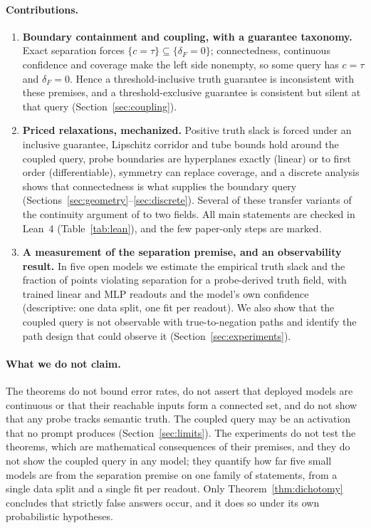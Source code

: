 \documentclass[10pt]{article}
\theoremstyle{definition}
\theoremstyle{remark}
\newcommand{\conf}{c}
\newcommand{\dF}{\delta_{\!F}}
\begin{document}
\paragraph{Contributions.}
\begin{enumerate}[leftmargin=*,itemsep=1pt,topsep=2pt]
\item \textbf{Boundary containment and coupling, with a guarantee
taxonomy.} Exact separation forces $\{\conf=\tau\}\subseteq\{\dF=0\}$;
connectedness, continuous confidence and coverage make the left side
nonempty, so some query has $\conf=\tau$ and $\dF=0$. Hence a threshold-inclusive
truth guarantee is inconsistent with these premises, and a
threshold-exclusive guarantee is consistent but silent at that query
(Section~\ref{sec:coupling}).
\item \textbf{Priced relaxations, mechanized.} Positive truth slack is
forced under an inclusive guarantee, Lipschitz corridor and tube bounds
hold around the coupled query, probe boundaries are hyperplanes exactly
(linear) or to first order (differentiable), symmetry can replace
coverage, and a discrete analysis shows that connectedness is what
supplies the boundary query (Sections~\ref{sec:geometry}--\ref{sec:discrete}).
Several of these transfer variants of the continuity argument of
\citet{bhatt2026defense} to two fields. All main statements are checked in Lean~4 (Table~\ref{tab:lean}), and
the few paper-only steps are marked.
\item \textbf{A measurement of the separation premise, and an
observability result.} In five open models we estimate the empirical truth
slack and the fraction of points violating separation for a probe-derived
truth field, with trained linear and MLP readouts and the model's own
confidence (descriptive: one data split, one fit per readout). We also
show that the coupled query is not observable with true-to-negation paths
and identify the path design that could observe it
(Section~\ref{sec:experiments}).
\end{enumerate}

\paragraph{What we do not claim.}
The theorems do not bound error rates, do not assert that deployed
models are continuous or that their reachable inputs form a connected
set, and do not show that any probe tracks semantic truth. The coupled
query may be an activation that no prompt produces
(Section~\ref{sec:limits}). The experiments do not test the theorems,
which are mathematical consequences of their premises, and they do not
show the coupled query in any model; they quantify how far five small
models are from the separation premise on one family of statements, from
a single data split and a single fit per readout. Only Theorem~\ref{thm:dichotomy} concludes that strictly
false answers occur, and it does so under its own probabilistic
hypotheses.
\end{document}
